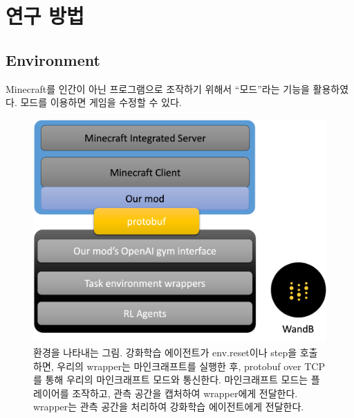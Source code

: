 \documentclass{tudelftposter}
\begin{document}
\section{연구 방법}
\subsection{Environment}
Minecraft를 인간이 아닌 프로그램으로 조작하기 위해서 ``모드''라는 기능을 활용하였다. 모드를 이용하면 게임을 수정할 수 있다.

\begin{figure}
  \centering
  \includegraphics[width=.3\textwidth]{arch1.png}
  \caption{환경을 나타내는 그림. 강화학습 에이전트가 env.reset이나 step을 호출하면, 우리의 wrapper는 마인크래프트를 실행한 후, protobuf over TCP를 통해 우리의 마인크래프트 모드와 통신한다. 마인크래프트 모드는 플레이어를 조작하고, 관측 공간을 캡처하여 wrapper에게 전달한다. wrapper는 관측 공간을 처리하여 강화학습 에이전트에게 전달한다.}
  \label{fig:test}
\end{figure}

  
\end{document}
